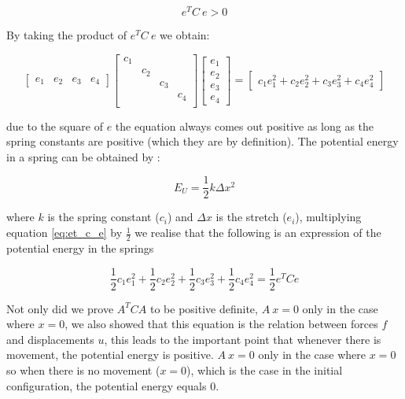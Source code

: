 \begin{equation}
\label{eq:et_c_e}
e^T C \ e > 0 
\end{equation}

By taking the product of $e^T C \ e$ we obtain:

\begin{equation*}
\begin{bmatrix}
e_1 & e_2 & e_3 & e_4
\end{bmatrix}
\begin{bmatrix}
c_1 &  &  &  \\
 & c_2 &  &  \\
 &  & c_3 &  \\
 &  &  & c_4 \\
\end{bmatrix}
\begin{bmatrix}
e_1 \\ e_2\\ e_3 \\ e_4
\end{bmatrix}
=
\begin{bmatrix}
c_1 e_1^2 + c_2 e_2^2 + c_3 e_3^2 + c_4 e_4^2
\end{bmatrix}
\end{equation*}

due to the square of $e$ the equation always comes out positive as long as the spring
constants are positive (which they are by definition). 
The potential energy in a spring can be obtained by
:

\begin{equation}
\label{eq:hooks_potential_energy}
E_U = \frac{1}{2} k \Delta x^2
\end{equation}

where $k$ is the spring constant ($c_i$) and $\Delta x$ is the stretch ($e_i$),
multiplying equation \eqref{eq:et_c_e} by $\frac{1}{2}$ we realise that
the following is an expression of the potential energy in the springs

\begin{equation}
\frac{1}{2}c_1 e_1^2 + \frac{1}{2}c_2 e_2^2 + \frac{1}{2}c_3 e_3^2 +
\frac{1}{2}c_4 e_4^2 =
\frac{1}{2}e^TCe 
\end{equation}

Not only did we prove $A^T C A$ to be positive
definite, $A \ x = 0$ only in the case where $x=0$, we also
showed that this equation is the relation between forces $f$ and
displacements $u$, this leads to the important point that whenever
there is movement, the potential energy is positive. 
%
$A \ x = 0$ only in the case where $x=0$ so when there is no movement
($x=0$), which is the case in the initial configuration, the potential
energy equals $0$.\\ 


